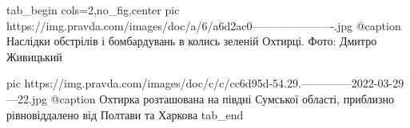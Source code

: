  
 
 
 
 

\ifcmt
  tab_begin cols=2,no_fig,center
     pic https://img.pravda.com/images/doc/a/6/a6d2ac0----------------------.jpg
     @caption Наслідки обстрілів і бомбардувань в колись зеленій Охтирці. Фото: Дмитро Живицький

     pic https://img.pravda.com/images/doc/c/c/cc6d95d-54.29.--------------2022-03-29---22.jpg
     @caption Охтирка розташована на півдні Сумської області, приблизно рівновіддалено від Полтави та Харкова
  tab_end
\fi
